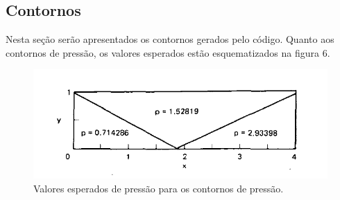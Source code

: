 \documentclass[a4paper, twoside, 12pt]{article}
\numberwithin{equation}{section}
\begin{document}
    \subsection{Contornos}
    Nesta seção serão apresentados os contornos gerados pelo código. Quanto aos contornos de pressão, os valores esperados estão esquematizados na figura 6.
        \begin{figure}[H]
            \centering
            \includegraphics[width=.9\linewidth]{pics/results.png}
            \caption{Valores esperados de pressão para os contornos de pressão.\cite{YEE_NASATM_1983}}
            \vspace*{-5pt}
        \end{figure}
\end{document}
